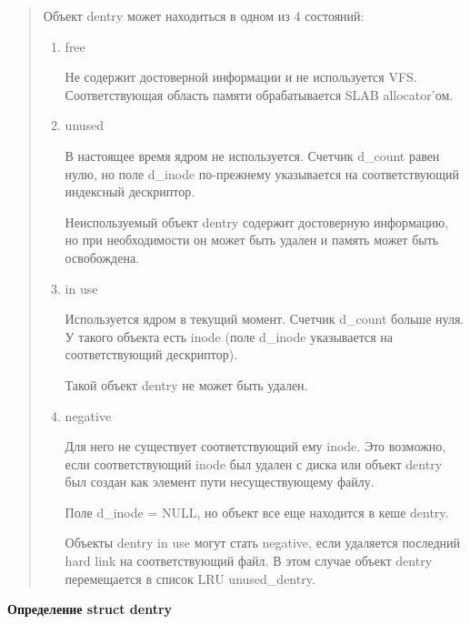 \begin{quote}
Объект dentry может находиться в одном из 4 состояний:
\begin{enumerate}
\item free

Не содержит достоверной информации и не используется VFS. Соответствующая область памяти обрабатывается SLAB allocator'ом.
\item unused

В настоящее время ядром не используется. Счетчик d\_count равен нулю, но поле d\_inode по-прежнему указывается на соответствующий индексный дескриптор.

Неиспользуемый объект dentry содержит достоверную информацию, но при необходимости он может быть удален и память может быть освобождена.

\item in use

Используется ядром в текущий момент. Счетчик d\_count больше нуля. У такого объекта есть inode (поле d\_inode указывается на соответствующий дескриптор).

Такой объект dentry не может быть удален.

\item negative

Для него не существует соответствующий ему inode. Это возможно, если соответствующий inode был удален с диска или объект dentry был создан как элемент пути несуществующему файлу.

Поле d\_inode = NULL, но объект все еще находится в кеше dentry.

Объекты dentry in use могут стать negative, если удаляется последний hard link на соответствующий файл. В этом случае объект dentry перемещается в список LRU unused\_dentry.
\end{enumerate}
\end{quote}

\textbf{Определение struct dentry}

